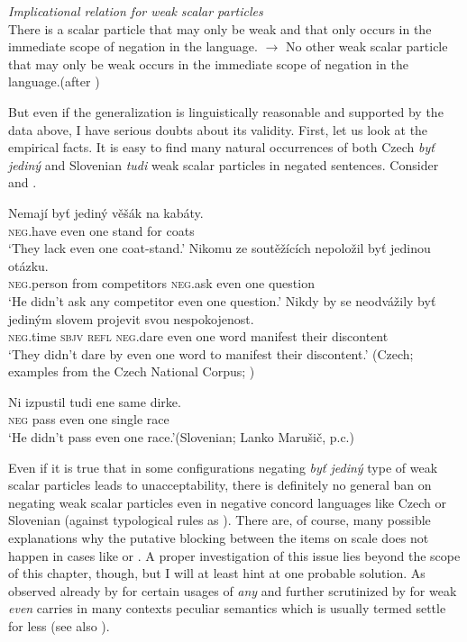 \documentclass[output=paper,colorlinks,citecolor=brown]{langscibook}
\begin{document}
\eanoraggedright\label{ex:55} \textit{Implicational relation for weak scalar particles}\\
There is a scalar particle that may only be weak and that only occurs in the immediate scope of negation in the language. $\rightarrow$ No other weak scalar particle that may only be weak occurs in the immediate scope of negation in the language.\hfill (after \citealt[131]{Crnic2011})
\z

\largerpage[-1]
\noindent But even if the generalization is linguistically reasonable and supported by the data above, I have serious doubts about its validity. First, let us look at the empirical facts. It is easy to find many natural occurrences of both Czech \emph{byť jediný} and Slovenian \emph{tudi} weak scalar particles in negated sentences. Consider  and .

\ea\label{ex:56}\ea \gll Nemají byť jediný věšák na kabáty.\\
\textsc{neg}.have even one stand for coats\\
\glt `They lack even one coat-stand.'
\ex \gll Nikomu ze soutěžících nepoložil byť jedinou otázku.\\
\textsc{neg}.person from competitors \textsc{neg}.ask even one question\\
\glt `He didn't ask any competitor even one question.'
\ex \gll Nikdy by se neodvážily byť jediným slovem projevit svou nespokojenost.\\
\textsc{neg}.time \textsc{sbjv} \textsc{refl} \textsc{neg}.dare even one word manifest their discontent\\
\glt `They didn't dare by even one word to manifest their discontent.'\smallskip
\z
\hfill (Czech; examples from the Czech National Corpus; \citealt{kren-etal20})
\z

\ea\label{ex:57}\gll Ni izpustil tudi ene same dirke.\\
\textsc{neg} pass even one single race\\
\glt `He didn't pass even one race.'\hfill (Slovenian; Lanko Marušič, p.c.)
\z

\noindent Even if it is true that in some configurations negating \emph{byť jediný} type of weak scalar particles leads to unacceptability, there is definitely no general ban on negating weak scalar particles even in negative concord languages like Czech or Slovenian (against  typological rules as ). There are, of course, many possible explanations why the putative blocking between the items on scale  does not happen in cases like  or . A proper investigation of this issue lies beyond the scope of this chapter, though, but I will at least hint at one probable solution. As observed already by \citet{kadmon1993any} for certain usages of \emph{any} and further scrutinized by \citet{Crnic2011,alonso2016all} for weak \emph{even} carries in many contexts peculiar semantics which is usually termed settle for less (see also ).
\end{document}
